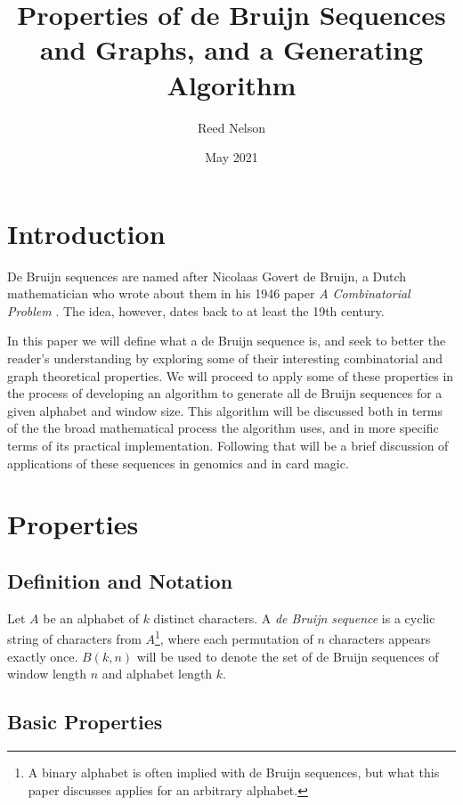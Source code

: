 \documentclass[12pt]{article}
\title{Properties of de Bruijn Sequences and Graphs, and a Generating Algorithm}
\author{Reed Nelson}
\date{May 2021}
\begin{document}
\maketitle

\section{Introduction}
De Bruijn sequences are named after Nicolaas Govert de Bruijn, a Dutch mathematician who wrote about them in his 1946 paper \emph{A Combinatorial Problem} \citep{debruijn_1946}. The idea, however, dates back to at least the 19th century. \par
In this paper we will define what a de Bruijn sequence is, and seek to better the reader’s understanding by exploring some of their interesting combinatorial and graph theoretical properties. We will proceed to apply some of these properties in the process of developing an algorithm to generate all de Bruijn sequences for a given alphabet and window size. This algorithm will be discussed both in terms of the the broad mathematical process the algorithm uses, and in more specific terms of its practical implementation. Following that will be a brief discussion of applications of these sequences in genomics and in card magic.  


\section{Properties}
\subsection{Definition and Notation}
Let $A$ be an alphabet of $k$ distinct characters. A \emph{de Bruijn sequence} is a cyclic string of characters from $A$\footnote{A binary alphabet is often implied with de Bruijn sequences, but what this paper discusses applies for an arbitrary alphabet.}, where each permutation of $n$ characters appears exactly once. $B(k,n)$ will be used to denote the set of de Bruijn sequences of window length $n$ and alphabet length $k$.

\subsection{Basic Properties}
\end{document}
